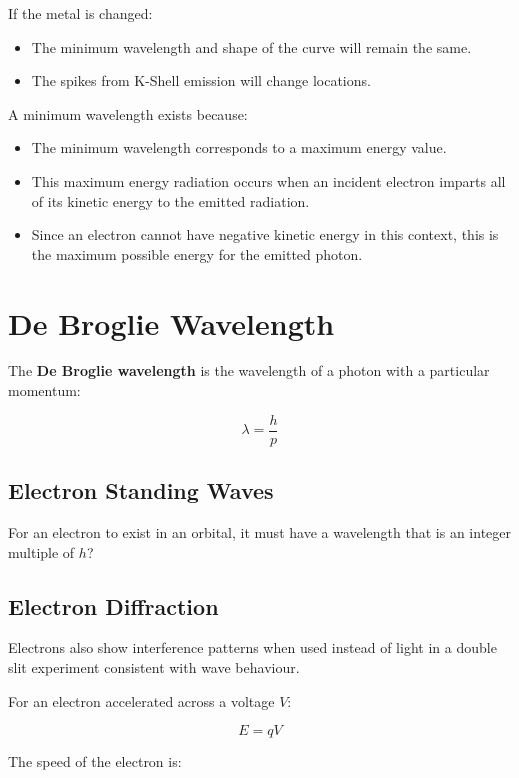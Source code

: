 \documentclass[a4paper,11pt]{report}
\begin{document}
If the metal is changed:

\begin{itemize}
\item The minimum wavelength and shape of the curve will remain the same.
\item The spikes from K-Shell emission will change locations.
\end{itemize}

A minimum wavelength exists because:

\begin{itemize}
\item The minimum wavelength corresponds to a maximum energy value.
\item This maximum energy radiation occurs when an incident electron imparts all
	of its kinetic energy to the emitted radiation.
\item Since an electron cannot have negative kinetic energy in this context,
	this is the maximum possible energy for the emitted photon.
\end{itemize}


\section{De Broglie Wavelength}

The \textbf{De Broglie wavelength} is the wavelength of a photon with a
particular momentum:

$$
\lambda = \frac{h}{p}
$$

\subsection{Electron Standing Waves}


For an electron to exist in an orbital, it must have a wavelength that is an
integer multiple of $h$?

\subsection{Electron Diffraction}

Electrons also show interference patterns when used instead of light in a
double slit experiment consistent with wave behaviour.

For an electron accelerated across a voltage $V$:

$$
E = qV
$$

The speed of the electron is:
\end{document}
